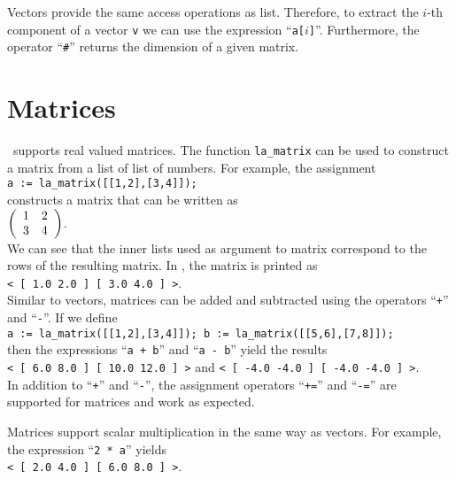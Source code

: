 Vectors provide the same access operations as list.  Therefore, to extract the $i$-th component of a
vector \texttt{v} we can use the expression ``\texttt{a[$i$]}''.  Furthermore, the operator
``\texttt{\#}'' returns the dimension of a given matrix.


\section{Matrices}
\setlx\ supports real valued matrices.  The function \texttt{la\_matrix} can be used to construct a
matrix from a list of list of numbers.  For example, the assignment
\\[0.2cm]
\hspace*{1.3cm}
\texttt{a := la\_matrix([[1,2],[3,4]]);}
\\[0.2cm]
constructs a matrix that can be written as
\\[0.2cm]
\hspace*{1.3cm}
$
\left(
\begin{array}[c]{ll}
  1 & 2 \\
  3 & 4
\end{array}
\right)
$.
\\[0.2cm]
We can see that the inner lists used as argument to matrix correspond to the rows of the resulting
matrix.   In \setlx, the matrix is printed as
\\[0.2cm]
\hspace*{1.3cm}
\texttt{< [ 1.0  2.0 ]  [ 3.0  4.0 ] >}.
\\[0.2cm]
Similar to vectors, matrices can be added and subtracted using the operators ``\texttt{+}'' and
``\texttt{-}''.   If we define
\\[0.2cm]
\hspace*{1.3cm}
\texttt{a := la\_matrix([[1,2],[3,4]]);   b := la\_matrix([[5,6],[7,8]]);}   
\\[0.2cm]
then the expressions ``\texttt{a + b}'' and ``\texttt{a - b}'' yield the results
\\[0.2cm]
\hspace*{1.3cm}
\texttt{< [ 6.0  8.0 ]  [ 10.0  12.0 ] >} \quad and \quad \texttt{< [ -4.0  -4.0 ]  [ -4.0  -4.0 ] >}.
\\[0.2cm]
In addition to ``\texttt{+}'' and ``\texttt{-}'', the assignment operators ``\texttt{+=}'' and
``\texttt{-=}'' are supported for matrices and work as expected.

Matrices support scalar multiplication in the same way as vectors.  For example, the expression
``\texttt{2 * a}'' yields
\\[0.2cm]
\hspace*{1.3cm}
\texttt{< [ 2.0  4.0 ]  [ 6.0  8.0 ] >}.
\vspace*{0.2cm} 

